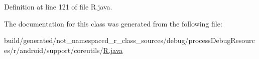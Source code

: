 Definition at line 121 of file R.\+java.



The documentation for this class was generated from the following file\+:\begin{DoxyCompactItemize}
\item 
build/generated/not\+\_\+namespaced\+\_\+r\+\_\+class\+\_\+sources/debug/process\+Debug\+Resources/r/android/support/coreutils/\mbox{\hyperlink{android_2support_2coreutils_2_r_8java}{R.\+java}}\end{DoxyCompactItemize}
